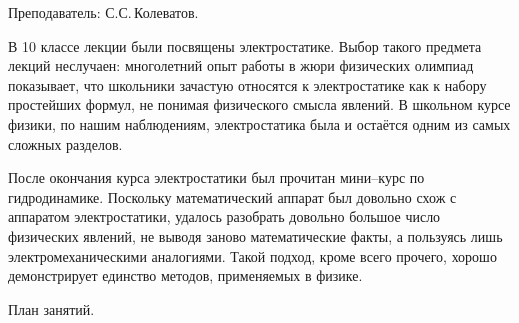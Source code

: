 \documentclass[12pt,a4paper,oneside,draft]{scrartcl}
\begin{document}
\textsf{Преподаватель: С.С.\,Колеватов.}
\smallskip

В 10 классе лекции были посвящены электростатике. Выбор такого
предмета лекций неслучаен: многолетний опыт работы в жюри физических
олимпиад показывает, что школьники зачастую относятся к электростатике
как к набору простейших формул, не понимая физического смысла
явлений. В школьном курсе физики, по нашим наблюдениям, электростатика
была и остаётся одним из самых сложных разделов.

После окончания курса электростатики был прочитан мини–курс по
гидродинамике. Поскольку математический аппарат был довольно схож с
аппаратом электростатики, удалось разобрать довольно большое число
физических явлений, не выводя заново математические факты, а пользуясь
лишь электромеханическими аналогиями. Такой подход, кроме всего
прочего, хорошо демонстрирует единство методов, применяемых в физике. 

\begin{center}
  \textsf{План занятий.}
\end{center}
\end{document}
